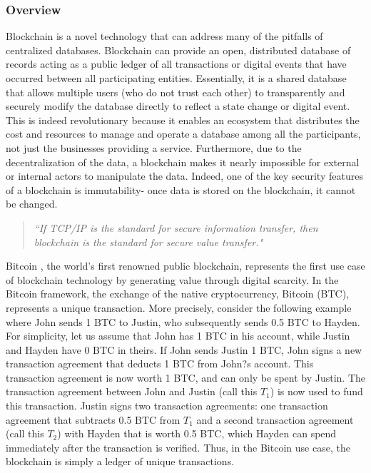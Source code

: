 \subsubsection{Overview}
Blockchain is a novel technology that can address many of the pitfalls of centralized databases. Blockchain can provide an open, distributed database of records acting as a public ledger of all transactions or digital events that have occurred between all participating entities. Essentially, it is a shared database that allows multiple users (who do not trust each other) to transparently and securely modify the database directly to reflect a state change or digital event. This is indeed revolutionary because it enables an ecosystem that distributes the cost and resources to manage and operate a database among all the participants, not just the businesses providing a service. Furthermore, due to the decentralization of the data, a blockchain makes it nearly impossible for external or internal actors to manipulate the data. Indeed, one of the key security features of a blockchain is immutability- once data is stored on the blockchain, it cannot be changed.
%
\begin{framed}
\begin{quote}
\textit{``If TCP/IP is the standard for secure information transfer, then blockchain is the standard for secure value transfer."}
\end{quote}
\end{framed}

Bitcoin \cite{BTC08}, the world's first renowned public blockchain, represents the first use case of blockchain technology by generating value through digital scarcity. In the Bitcoin framework, the exchange of the native cryptocurrency, Bitcoin (BTC), represents a unique transaction. More precisely, consider the following example where John sends 1 BTC to Justin, who subsequently sends 0.5 BTC to Hayden. For simplicity, let us assume that John has 1 BTC in his account, while Justin and Hayden have 0 BTC in theirs. If John sends Justin 1 BTC, John signs a new transaction agreement that deducts 1 BTC from John?s account. This transaction agreement is now worth 1 BTC, and can only be spent by Justin. The transaction agreement between John and Justin (call this $T_1$) is now used to fund this transaction. Justin signs two transaction agreements: one transaction agreement that subtracts 0.5 BTC from $T_1$ and a second transaction agreement (call this $T_2$) with Hayden that is worth 0.5 BTC, which Hayden can spend immediately after the transaction is verified. Thus, in the Bitcoin use case, the blockchain is simply a ledger of unique transactions.

